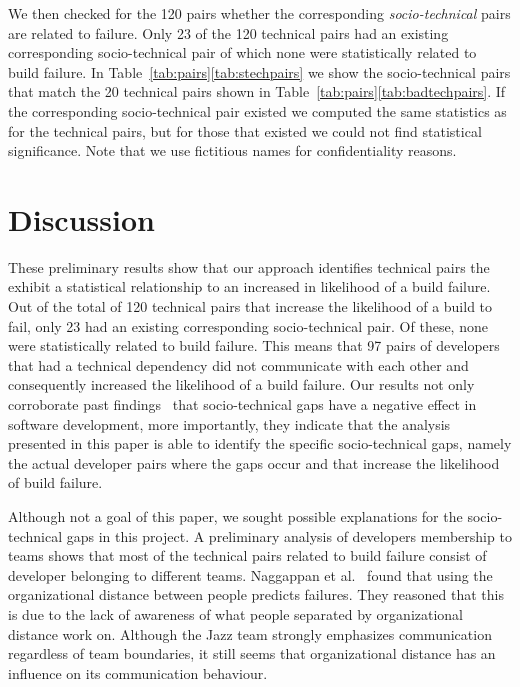 \documentclass[conference]{IEEEtran}
\begin{document}
We then checked for the 120 pairs whether the corresponding \emph{socio-technical} pairs are related to failure.
Only 23 of the 120 technical pairs had an existing corresponding socio-technical pair of which none were statistically related to build failure. 
In Table~\ref{tab:pairs}\ref{tab:stechpairs} we show the socio-technical pairs that match the 20 technical pairs shown in Table~\ref{tab:pairs}\ref{tab:badtechpairs}.
If the corresponding socio-technical pair existed we computed the same statistics as for the technical pairs, but for those that existed we could not find statistical significance.
Note that we use fictitious names for confidentiality reasons.


\section{Discussion}
These preliminary results show that our approach identifies technical pairs the exhibit a statistical relationship to an increased in likelihood of a build failure.
Out of the total of 120 technical pairs that increase the likelihood of a
build to fail, only 23 had an existing
corresponding socio-technical pair. Of these, none were statistically
related to build failure. This means that 97 pairs of developers that had a
technical dependency did not communicate with each other and
consequently increased the likelihood of a build failure. Our results not only
corroborate past findings~\cite{cataldo:cscw:2006,cataldo:esem:2008} that socio-technical gaps
have a negative effect in software development, more importantly, they indicate
that the analysis presented in this paper is able to identify the specific
socio-technical gaps, namely the actual developer pairs where the gaps occur
and that increase the likelihood of build failure. 

Although not a goal of this paper, we sought possible explanations for the
socio-technical gaps in this project. A preliminary analysis of developers
membership to teams shows that most
of the technical pairs related to build failure consist of developer belonging to
different teams. Naggappan et al.~\cite{nagappan:icse:2008} found that using the
organizational distance between people predicts failures. They reasoned that this
is due to the lack of awareness of what people separated by organizational distance
work on. Although the Jazz team strongly emphasizes communication
regardless of team boundaries, it still seems that organizational distance has
an influence on its communication behaviour.
\end{document}
